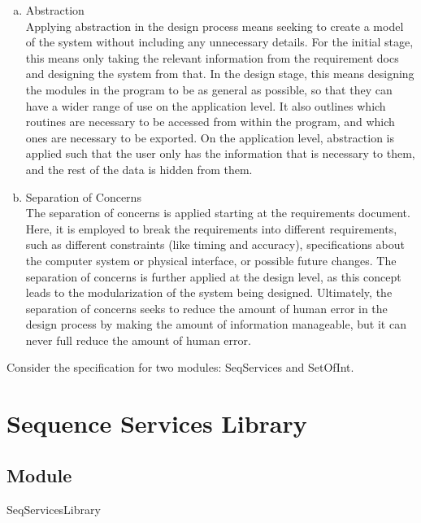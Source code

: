 \documentclass[12pt,fleqn]{examtst}
\begin{document}
\begin{enumerate}[a)]
\item Abstraction \\
Applying abstraction in the design process means seeking to create a model of the system without including any unnecessary details. For the initial stage, this means only taking the relevant information from the requirement docs and designing the system from that. In the design stage, this means designing the modules in the program to be as general as possible, so that they can have a wider range of use on the application level. It also outlines which routines are necessary to be accessed from within the program, and which ones are necessary to be exported. On the application level, abstraction is applied such that the user only has the information that is necessary to them, and the rest of the data is hidden from them. 
\item Separation of Concerns \\
The separation of concerns is applied starting at the requirements document. Here, it is employed to break the requirements into different requirements, such as different constraints (like timing and accuracy), specifications about the computer system or physical interface, or possible future changes. The separation of concerns is further applied at the design level, as this concept leads to the modularization of the system being designed. Ultimately, the separation of concerns seeks to reduce the amount of human error in the design process by making the amount of information manageable, but it can never full reduce the amount of human error. \\
\end{enumerate}


\newpage

\noindent Consider the specification for two modules: SeqServices and SetOfInt.

\section* {Sequence Services Library}

\subsection*{Module}

SeqServicesLibrary
\end{document}
